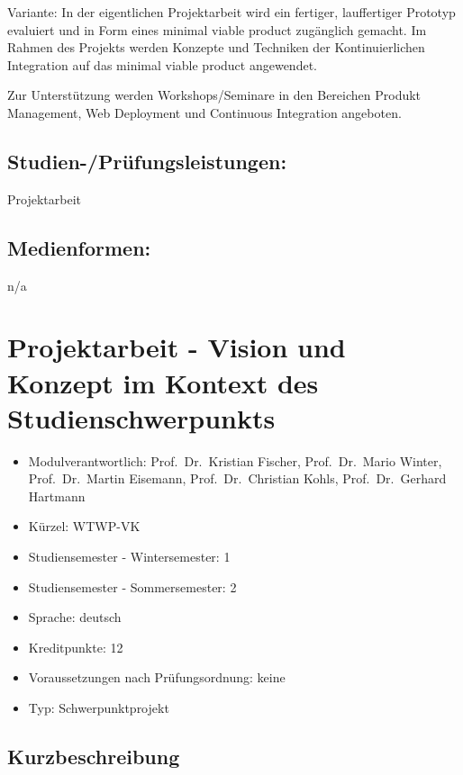 Variante: In der eigentlichen Projektarbeit wird ein fertiger,
lauffertiger Prototyp evaluiert und in Form eines minimal viable product
zugänglich gemacht. Im Rahmen des Projekts werden Konzepte und Techniken
der Kontinuierlichen Integration auf das minimal viable product
angewendet.

Zur Unterstützung werden Workshops/Seminare in den Bereichen Produkt
Management, Web Deployment und Continuous Integration angeboten.

\section*{Studien-/Prüfungsleistungen:}\label{studien-pruxfcfungsleistungen-9}

Projektarbeit

\section*{Medienformen:}\label{medienformen-9}

n/a

\chapter{Projektarbeit - Vision und Konzept im Kontext des
Studienschwerpunkts}\label{projektarbeit---vision-und-konzept-im-kontext-des-studienschwerpunkts}

\begin{itemize}
\tightlist
\item
  Modulverantwortlich: Prof.~Dr.~Kristian Fischer, Prof.~Dr.~Mario
  Winter, Prof.~Dr.~Martin Eisemann, Prof.~Dr.~Christian Kohls,
  Prof.~Dr.~Gerhard Hartmann
\item
  Kürzel: WTWP-VK
\item
  Studiensemester - Wintersemester: 1
\item
  Studiensemester - Sommersemester: 2
\item
  Sprache: deutsch
\item
  Kreditpunkte: 12
\item
  Voraussetzungen nach Prüfungsordnung: keine
\item
  Typ: Schwerpunktprojekt
\end{itemize}

\section*{Kurzbeschreibung}\label{kurzbeschreibung-4}

